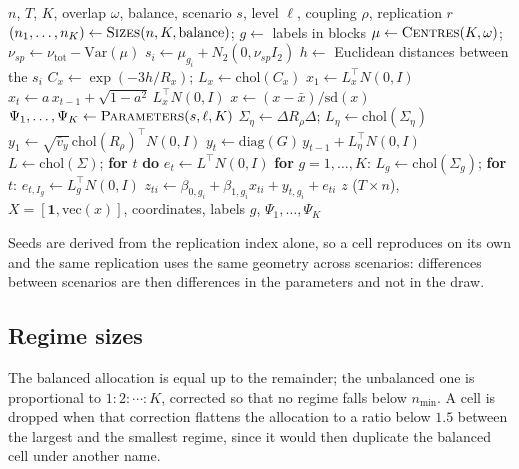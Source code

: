\documentclass[11pt]{article}
\begin{document}
\begin{algorithm}[H]
\caption{One replication of the design}\label{alg:dgp}
\begin{algorithmic}[1]
\Require $n$, $T$, $K$, overlap $\omega$, balance, scenario $s$, level $\ell$, coupling $\rho$, replication $r$
\State $(n_1,\dots,n_K) \gets \textsc{Sizes}(n, K, \text{balance})$; \; $g \gets$ labels in blocks
\State $\mu \gets \textsc{Centres}(K, \omega)$;\quad $\nu_{sp} \gets \nu_{\mathrm{tot}} - \mathrm{Var}(\mu)$
 \; $s_i \gets \mu_{g_i} + N_2(0, \nu_{sp} I_2)$ \EndFor
\State $h \gets$ Euclidean distances between the $s_i$
\State $C_x \gets \exp(-3h/R_x)$; \; $L_x \gets \mathrm{chol}(C_x)$
\State $x_1 \gets L_x^\top N(0,I)$
 \; $x_t \gets a\,x_{t-1} + \sqrt{1-a^2}\, L_x^\top N(0,I)$ \EndFor
\State $x \gets (x - \bar x)/\mathrm{sd}(x)$
\State $\Psi_1,\dots,\Psi_K \gets \textsc{Parameters}(s, \ell, K)$ 
\State $\Sigma_\eta \gets \Delta R_\rho \Delta$; \; $L_\eta \gets \mathrm{chol}(\Sigma_\eta)$
\State $y_1 \gets \sqrt{\bar v_y}\,\mathrm{chol}(R_\rho)^\top N(0,I)$
 \; $y_t \gets \mathrm{diag}(G)\, y_{t-1} + L_\eta^\top N(0,I)$ \EndFor
{}
  \State $L \gets \mathrm{chol}(\Sigma)$; \; \textbf{for} $t$ \textbf{do} $e_t \gets L^\top N(0,I)$
\Else
  \State \textbf{for} $g = 1,\dots,K$: $L_g \gets \mathrm{chol}(\Sigma_g)$; \textbf{for} $t$: $e_{t,I_g} \gets L_g^\top N(0,I)$
\EndIf
{}
  \State $z_{ti} \gets \beta_{0,g_i} + \beta_{1,g_i} x_{ti} + y_{t,g_i} + e_{ti}$
\EndFor
\Ensure $z$ ($T \times n$), $X = [\mathbf{1}, \mathrm{vec}(x)]$, coordinates, labels $g$, $\Psi_1,\dots,\Psi_K$
\end{algorithmic}
\end{algorithm}

Seeds are derived from the replication index alone, so a cell reproduces on its own and the same replication uses the same geometry across scenarios: differences between scenarios are then differences in the parameters and not in the draw.

\subsection{Regime sizes}

The balanced allocation is equal up to the remainder; the unbalanced one is proportional to $1:2:\cdots:K$, corrected so that no regime falls below $n_{\min}$. A cell is dropped when that correction flattens the allocation to a ratio below $1.5$ between the largest and the smallest regime, since it would then duplicate the balanced cell under another name.
\end{document}
